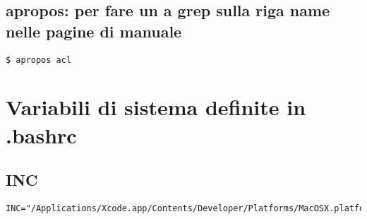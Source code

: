 \subsection{apropos: per fare un a grep sulla riga name nelle pagine di manuale}

\begin{lstlisting}
$ apropos acl
\end{lstlisting}



\section{Variabili di sistema definite in .bashrc}

\subsection{INC}

\begin{lstlisting}
INC="/Applications/Xcode.app/Contents/Developer/Platforms/MacOSX.platform/Developer/SDKs/MacOSX.sdk/usr/include/"
\end{lstlisting}

